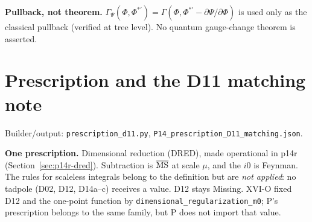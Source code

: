 \textbf{Pullback, not theorem.} $\Gamma_\Psi(\Phi,\Phi^{*\prime})=\Gamma(\Phi,\Phi^{*\prime}-\partial\Psi/\partial\Phi)$ is used
only as the classical pullback (verified at tree level). No quantum gauge-change theorem is asserted.

\section{Prescription and the D11 matching note}\label{sec:p14-presc}
\noindent Builder/output: \texttt{prescription\_d11.py}, \texttt{P14\_prescription\_D11\_matching.json}.\par\smallskip
\textbf{One prescription.} Dimensional reduction (DRED), made operational in p14r
(Section~\ref{sec:p14r-dred}). Subtraction is $\overline{\rm MS}$ at scale $\mu$, and the $i0$ is Feynman. The rules for
scaleless integrals belong to the definition but are \emph{not applied}: no tadpole (D02, D12, D14a--c) receives a value.
D12 stays Missing. XVI-O fixed D12 and the one-point function by
\texttt{dimensional\_regularization\_m0}; P's prescription belongs to the same family, but P does not import that value.

